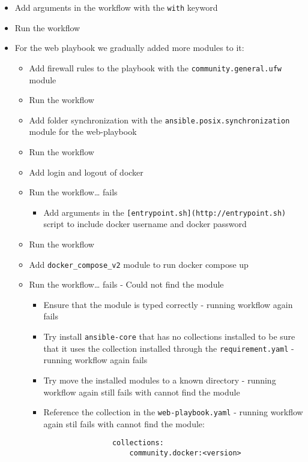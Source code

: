 \begin{itemize}
    \item Add arguments in the workflow with the \texttt{with} keyword
    \item Run the workflow
    \item For the web playbook we gradually added more modules to it:

    \begin{itemize}
        \item Add firewall rules to the playbook with the \texttt{community.general.ufw} module
        \item Run the workflow
        \item Add folder synchronization with the \texttt{ansible.posix.synchronization} module for the web-playbook
        \item Run the workflow
        \item Add login and logout of docker
        \item Run the workflow\ldots{} fails

        \begin{itemize}
            \item Add arguments in the \texttt{{[}entrypoint.sh{]}(http://entrypoint.sh)} script to include docker username and docker password
        \end{itemize}

        \item Run the workflow
        \item Add \texttt{docker\_compose\_v2} module to run docker compose up
        \item Run the workflow\ldots{} fails - Could not find the module

        \begin{itemize}
            \item Ensure that the module is typed correctly - running workflow again fails
            \item Try install \texttt{ansible-core} that has no collections installed to be sure that it uses the collection installed through the \texttt{requirement.yaml} - running workflow again fails
            \item Try move the installed modules to a known directory - running workflow again still fails with cannot find the module
            \item Reference the collection in the \texttt{web-playbook.yaml} - running workflow again stil fails with cannot find the module:

            \begin{verbatim}
                collections:
	                community.docker:<version>
            \end{verbatim}


\end{itemize}
\end{itemize}
\end{itemize}

